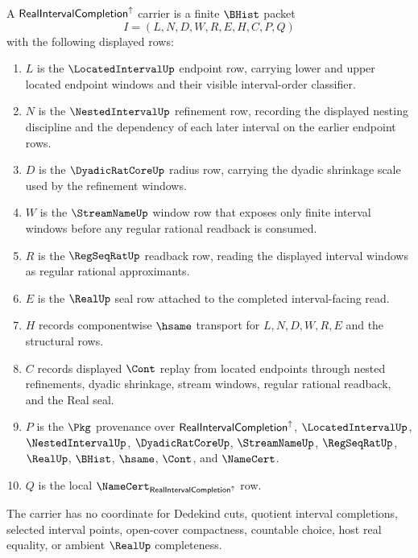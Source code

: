 \begin{definition}
\label{def:real-interval-completion-carrier}
A $\mathsf{RealIntervalCompletion}^{\uparrow}$ carrier is a finite $\BHist$ packet
$$
I=(L,N,D,W,R,E,H,C,P,Q)
$$
with the following displayed rows:
\begin{enumerate}
\item $L$ is the $\LocatedIntervalUp$ endpoint row, carrying lower and upper located endpoint windows and their visible interval-order classifier.
\item $N$ is the $\NestedIntervalUp$ refinement row, recording the displayed nesting discipline and the dependency of each later interval on the earlier endpoint rows.
\item $D$ is the $\DyadicRatCoreUp$ radius row, carrying the dyadic shrinkage scale used by the refinement windows.
\item $W$ is the $\StreamNameUp$ window row that exposes only finite interval windows before any regular rational readback is consumed.
\item $R$ is the $\RegSeqRatUp$ readback row, reading the displayed interval windows as regular rational approximants.
\item $E$ is the $\RealUp$ seal row attached to the completed interval-facing read.
\item $H$ records componentwise $\hsame$ transport for $L,N,D,W,R,E$ and the structural rows.
\item $C$ records displayed $\Cont$ replay from located endpoints through nested refinements, dyadic shrinkage, stream windows, regular rational readback, and the Real seal.
\item $P$ is the $\Pkg$ provenance over $\mathsf{RealIntervalCompletion}^{\uparrow}$, $\LocatedIntervalUp$, $\NestedIntervalUp$, $\DyadicRatCoreUp$, $\StreamNameUp$, $\RegSeqRatUp$, $\RealUp$, $\BHist$, $\hsame$, $\Cont$, and $\NameCert$.
\item $Q$ is the local $\NameCert_{\RealIntervalCompletionUp}$ row.
\end{enumerate}
The carrier has no coordinate for Dedekind cuts, quotient interval completions, selected interval points, open-cover compactness, countable choice, host real equality, or ambient $\RealUp$ completeness.
\end{definition}

